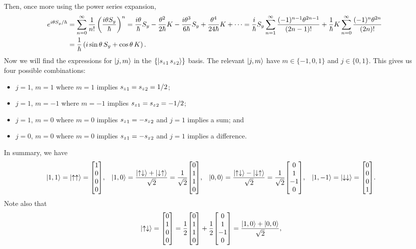 \begin{solution}
	Then, once more using the power series expansion,
	\begin{align*}
		e^{i \theta S_y / \hbar} &= \sum_{n = 0}^\infty \frac{1}{n!} \left( \frac{i \theta S_y}{\hbar} \right)^n
		= \frac{i \theta}{\hbar} S_y - \frac{\theta^2}{2 \hbar} K - \frac{i \theta^3}{6 \hbar} S_y + \frac{\theta^4}{24 \hbar} K + \cdots
		= \frac{i}{\hbar} S_y \sum_{n = 1}^\infty \frac{(-1)^{n-1} \theta^{2n - 1}}{(2n - 1)!} + \frac{1}{\hbar} K \sum_{n = 0}^\infty \frac{(-1)^n \theta^{2n}}{(2n)!} \\
		&= \frac{1}{\hbar} \left( i \sin{\theta} \, S_y + \cos{\theta} \, K \right).
	\end{align*}
	Now we will find the expressions for $\ket{j, m}$ in the $\{ \ket{{s_z}_1 \, {s_z}_2} \}$ basis.  The relevant $\ket{j, m}$ have $m \in \{ -1, 0, 1 \}$ and $j \in \{ 0, 1 \}$.  This gives us four possible combinations:
	\begin{itemize}
		\item $j = 1$, $m = 1$ where $m = 1$ implies ${s_z}_1 = {s_z}_2 = 1/2$;
		\item $j = 1$, $m = -1$ where $m = -1$ implies ${s_z}_1 = {s_z}_2 = -1/2$;
		\item $j = 1$, $m = 0$ where $m = 0$ implies ${s_z}_1 = -{s_z}_2$ and $j = 1$ implies a sum; and
		\item $j = 0$, $m = 0$ where $m = 0$ implies ${s_z}_1 = -{s_z}_2$ and $j = 1$ implies a difference.
	\end{itemize}
	In summary, we have
	\begin{align*}
		\kqq &= \kuu = \mqty[ 1 \\ 0 \\ 0 \\ 0 ], &
		\kqo &= \frac{\kud + \kdu}{\sqrt{2}} = \frac{1}{\sqrt{2}} \mqty[ 0 \\ 1 \\ 1 \\ 0 ], &
		\koo &= \frac{\kud - \kdu}{\sqrt{2}} = \frac{1}{\sqrt{2}} \mqty[ 0 \\ 1 \\ -1 \\ 0 ], &
		\kqnq &= \kdd = \mqty[ 0 \\ 0 \\ 0 \\ 1 ].
	\end{align*}
	Note also that
	\begin{align*}
		\kud &= \mqty[ 0 \\ 1 \\ 0 \\ 0 ] = \frac{1}{2} \mqty[ 0 \\ 1 \\ 1 \\ 0 ] + \frac{1}{2} \mqty[ 0 \\ 1 \\ -1 \\ 0 ] = \frac{\kqo + \koo}{\sqrt{2}}, &

\end{align*}
\end{solution}
